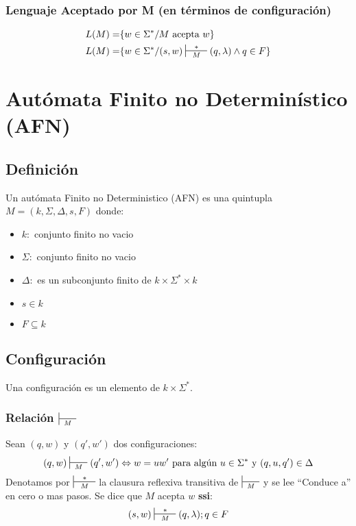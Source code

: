 \subsubsection{Lenguaje Aceptado por M (en términos de configuración)}
\begin{align*}
L(M) = & \{ w\in\Sigma^* / M \text{ acepta } w\} \\
L(M) = & \{ w\in\Sigma^* / (s,w) \sststile{M}{\hspace{0.25cm} * \hspace{0.25cm}} (q,\lambda) \wedge q\in F\}
\end{align*}
\section{Autómata Finito no Determinístico (AFN)}
\subsection{Definición}
Un autómata Finito no Deterministico (AFN) es una quintupla $M=(k,\Sigma,\Delta,s,F)$ donde:
\begin{itemize}
\item $k:$ conjunto finito no vacio
\item $\Sigma:$ conjunto finito no vacio
\item $\Delta:$ es un subconjunto finito de $k\times\Sigma^* \times k$
\item $s\in k$
\item $F\subseteq k$
\end{itemize}
\subsection{Configuración}
Una configuración es un elemento de $k\times \Sigma^*$.

\subsubsection{Relación $\sststile{M}{\hspace{0.25cm}  \hspace{0.25cm}}$}
Sean $(q,w)$ y $(q',w')$ dos configuraciones:
$$
	(q,w) \sststile{M}{\hspace{0.25cm}  \hspace{0.25cm}} (q',w') \Leftrightarrow w = uw' \text{ para algún } u \in\Sigma^* \text{ y } (q,u,q')\in\Delta
$$
Denotamos por $\sststile{M}{\hspace{0.25cm} * \hspace{0.25cm}}$ la clausura reflexiva transitiva de $\sststile{M}{\hspace{0.25cm}  \hspace{0.25cm}}$ y se lee ``Conduce a'' en cero o mas pasos. Se dice que $M$ acepta $w$ \textbf{ssi}:
$$
	(s,w) \sststile{M}{\hspace{0.25cm} * \hspace{0.25cm}} (q,\lambda ); q\in F
$$
